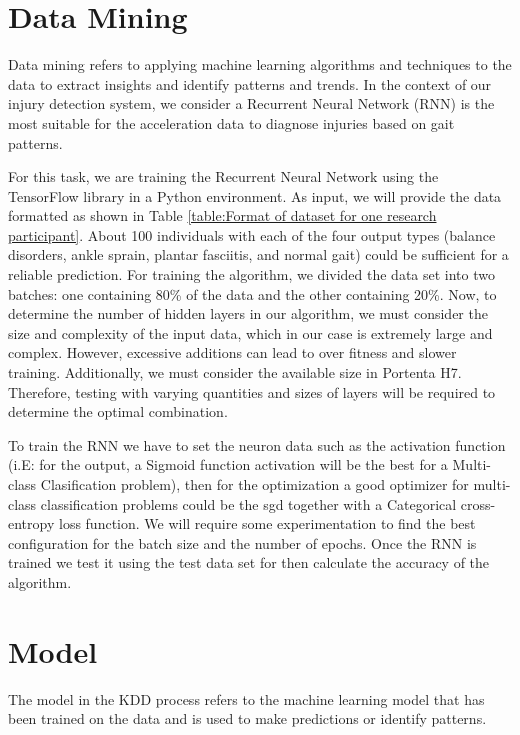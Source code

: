 \section{Data Mining}

Data mining refers to applying machine learning algorithms and techniques to the data to extract insights and identify patterns and trends. In the context of our injury detection system, we consider a Recurrent Neural Network (RNN) is the most suitable for the acceleration data to diagnose injuries based on gait patterns.

\bigskip
For this task, we are training the Recurrent Neural Network using the TensorFlow library in a Python environment. As input, we will provide the data formatted as shown in Table \ref{table:Format of dataset for one research participant}. About 100 individuals with each of the four output types (balance disorders, ankle sprain, plantar fasciitis, and normal gait) could be sufficient for a reliable prediction. For training the algorithm, we divided the data set into two batches: one containing 80\% of the data and the other containing 20\%. Now, to determine the number of hidden layers in our algorithm, we must consider the size and complexity of the input data, which in our case is extremely large and complex. However, excessive additions can lead to over fitness and slower training. Additionally, we must consider the available size in Portenta H7. Therefore, testing with varying quantities and sizes of layers will be required to determine the optimal combination.

\bigskip

To train the RNN we have to set the neuron data such as the activation function (i.E: for the output, a Sigmoid function activation will be the best for a Multi-class Clasification problem), then for the optimization a good optimizer for multi-class classification problems could be the \ac{sgd} together with a Categorical cross-entropy loss function. We will require some experimentation to find the best configuration for the batch size and the number of epochs. Once the RNN is trained we test it using the test data set for then calculate the accuracy of the algorithm.
\section{Model}
The model in the KDD process refers to the machine learning model that has been trained on the data and is used to make predictions or identify patterns.

